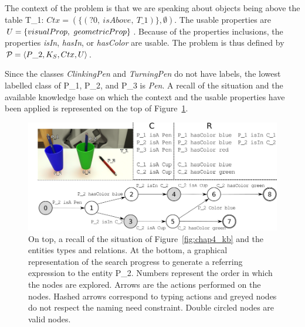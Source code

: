 The context of the problem is that we are speaking about objects being above the table T\_1: $Ctx = (\{(?0,\ isAbove,\ T\_1)\}, \emptyset)$. The usable properties are $U = \{visualProp,\ geometricProp\}$. Because of the properties inclusions, the properties \textit{isIn}, \textit{hasIn}, or \textit{hasColor} are usable. The problem is thus defined by $\mathcal{P} = \langle P\_2, K_S, Ctx, U \rangle$.

Since the classes \textit{ClinkingPen} and \textit{TurningPen} do not have labels, the lowest labelled class of P\_1, P\_2, and P\_3 is \textit{Pen}. A recall of the situation and the available knowledge base on which the context and the usable properties have been applied is represented on the top of Figure~\ref{fig:chap4_search}.

\begin{figure}[ht!]
\centering
\includegraphics[scale=0.45]{figures/chapter4/search.png}
\caption{\label{fig:chap4_search} On top, a recall of the situation of Figure~\ref{fig:chap4_kb} and the entities types and relations.
At the bottom, a graphical representation of the search progress to generate a referring expression to the entity P\_2. Numbers represent the order in which the nodes are explored. Arrows are the actions performed on the nodes. Hashed arrows correspond to typing actions and greyed nodes do not respect the naming need constraint. Double circled nodes are valid nodes. }
\end{figure}

